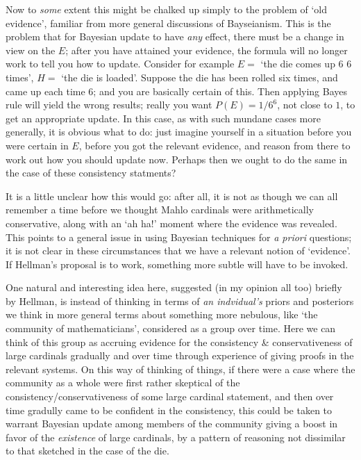\documentclass{amsart}
\theoremstyle{definition}
\begin{document}
Now to \emph{some} extent this might be chalked up simply to the problem of 
`old evidence', familiar from more general discussions of Bayseianism. This is the 
problem that for Bayesian update to have \emph{any} effect, there must be a 
change in view on the $E$; after you have attained your evidence,
the formula will no longer work to tell you how to update.
Consider for example $E =$ `the die comes up 6 6 times', 
$H =$ `the die is loaded'. Suppose 
the die has been rolled six times, and came up each time 6; and you are basically 
certain of this. Then applying 
Bayes rule will yield the wrong results; really you want $P(E) = 1/6^6$, 
not close to $1$, to get an appropriate update. 
In this case, as with such mundane cases more generally, 
it is obvious what to do: just imagine yourself in a situation before you were 
certain in $E$, before you got the relevant evidence, and reason from there to work
out how you should update now. Perhaps then we ought to do the same in the case 
of these consistency statments?

It is a little unclear how this would go: after all, it 
is not as though we can all remember a time before we thought Mahlo cardinals 
were arithmetically conservative, along with an `ah ha!' moment where the evidence was revealed. 
This points to a general issue in using 
Bayesian techniques for \emph{a priori} questions; it is not clear in 
these circumstances that we have a relevant notion of `evidence'.
If Hellman's proposal is to work, something more subtle will have to be invoked.

One natural and interesting idea here, suggested (in my opinion all too) 
briefly by Hellman, is instead of thinking in terms of \emph{an indvidual's} priors 
and posteriors we think in more general terms about
something more nebulous, like `the community of mathematicians', considered as a 
group over time. Here we can think of this group as accruing evidence for the 
consistency \& conservativeness of large cardinals gradually and over time through experience
of giving proofs in the relevant systems. On this way of thinking of things, if there 
were a case where the community as a whole were first rather skeptical of the 
consistency/conservativeness of some large cardinal statement, and then over time gradully came to 
be confident in the consistency, this could be taken to warrant Bayesian update 
among members of the community giving a boost in favor of the \emph{existence} of 
large cardinals, by a pattern of reasoning not dissimilar to that sketched in the case of the 
die.
\end{document}
